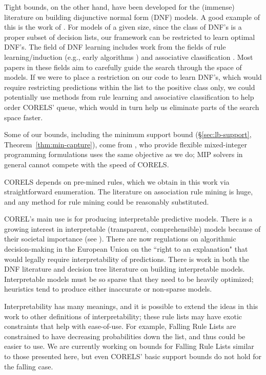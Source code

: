 Tight bounds, on the other hand, have been developed for the (immense) literature on building disjunctive normal form (DNF) models. A good example of this is the work of \citet{Rijnbeek10}.
For models of a given size, since the class of DNF's is a proper subset of decision lists, our framework can be restricted to learn optimal DNF's. The field of DNF learning includes work from the fields of rule learning/induction (e.g., early algorithms \citep{Michalski1969,ClarkNiblett1989,Frank1998}) and associative classification \citep{Vanhoof10}. Most papers in these fields aim to carefully guide the search through the space of models. If we were to place a restriction on our code to learn DNF's, which would require restricting predictions within the list to the positive class only, we could potentially use methods from rule learning and associative classification to help order CORELS' queue, which would in turn help us eliminate parts of the search space faster. 

Some of our bounds, including the minimum support bound (\S\ref{sec:lb-support}, Theorem~\ref{thm:min-capture}), come from \citep{RudinEr15}, who provide flexible mixed-integer programming formulations uses the same objective as we do; MIP solvers in general cannot compete with the speed of CORELS.

CORELS depends on pre-mined rules, which we obtain in this work via straightforward enumeration.
The literature on association rule mining is huge, and any method for rule mining could be reasonably substituted.

COREL's main use is for producing interpretable predictive models. There is a growing interest in interpretable (transparent, comprehensible) models because of their societal importance (see \citep{ruping2006learning,bratko1997machine,dawes1979robust,VellidoEtAl12,Giraud98,Holte93,Schmueli10,Huysmans11,Freitas14}). There are now regulations on algorithmic decision-making in the European Union on the ``right to an explanation" \citep{Goodman2016EU} that would legally require interpretability of predictions. There is work in both the DNF literature \citep{Ruckert2008} and decision tree literature \citep{GarofalakisHyRaSh00} on building interpretable models. Interpretable models must be so sparse that they need to be heavily optimized; heuristics tend to produce either inaccurate or non-sparse models.

Interpretability has many meanings, and it is possible to extend the ideas in this work to other definitions of interpretability; these rule lists may have exotic constraints that help with ease-of-use. For example, Falling Rule Lists \citep{WangRu15} are constrained to have decreasing probabilities down the list, and thus could be easier to use. We are currently working on bounds for Falling Rule Lists \citep{ChenRu17} similar to those presented here, but even CORELS' basic support bounds do not hold for the falling case. 

